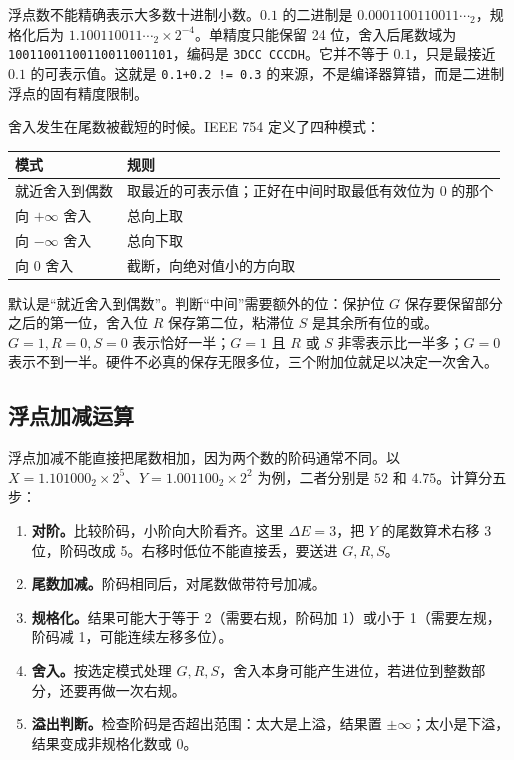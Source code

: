 浮点数不能精确表示大多数十进制小数。$0.1$ 的二进制是 $0.0001100110011\cdots_2$，规格化后为 $1.100110011\cdots_2\times2^{-4}$。单精度只能保留 24 位，舍入后尾数域为 \texttt{10011001100110011001101}，编码是 \texttt{3DCC CCCDH}。它并不等于 $0.1$，只是最接近 $0.1$ 的可表示值。这就是 \texttt{0.1+0.2 != 0.3} 的来源，不是编译器算错，而是二进制浮点的固有精度限制。

舍入发生在尾数被截短的时候。IEEE 754 定义了四种模式：

\begin{center}
\begin{tabular}{ll}
\toprule
模式 & 规则 \\
\midrule
就近舍入到偶数 & 取最近的可表示值；正好在中间时取最低有效位为 0 的那个 \\
向 $+\infty$ 舍入 & 总向上取 \\
向 $-\infty$ 舍入 & 总向下取 \\
向 0 舍入 & 截断，向绝对值小的方向取 \\
\bottomrule
\end{tabular}
\end{center}

默认是“就近舍入到偶数”。判断“中间”需要额外的位：保护位 $G$ 保存要保留部分之后的第一位，舍入位 $R$ 保存第二位，粘滞位 $S$ 是其余所有位的或。$G=1,R=0,S=0$ 表示恰好一半；$G=1$ 且 $R$ 或 $S$ 非零表示比一半多；$G=0$ 表示不到一半。硬件不必真的保存无限多位，三个附加位就足以决定一次舍入。

\subsection{浮点加减运算}

浮点加减不能直接把尾数相加，因为两个数的阶码通常不同。以 $X=1.101000_2\times2^5$、$Y=1.001100_2\times2^2$ 为例，二者分别是 $52$ 和 $4.75$。计算分五步：

\begin{enumerate}
  \item \textbf{对阶。}比较阶码，小阶向大阶看齐。这里 $\Delta E=3$，把 $Y$ 的尾数算术右移 3 位，阶码改成 5。右移时低位不能直接丢，要送进 $G,R,S$。
  \item \textbf{尾数加减。}阶码相同后，对尾数做带符号加减。
  \item \textbf{规格化。}结果可能大于等于 2（需要右规，阶码加 1）或小于 1（需要左规，阶码减 1，可能连续左移多位）。
  \item \textbf{舍入。}按选定模式处理 $G,R,S$，舍入本身可能产生进位，若进位到整数部分，还要再做一次右规。
  \item \textbf{溢出判断。}检查阶码是否超出范围：太大是上溢，结果置 $\pm\infty$；太小是下溢，结果变成非规格化数或 0。
\end{enumerate}

